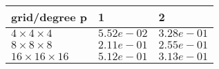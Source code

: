 \begin{tabular}{lll}
\hline
 grid/degree p            & 1          & 2          \\
\hline
 $4 \times 4 \times 4$    & $5.52e-02$ & $3.28e-01$ \\
 $8 \times 8 \times 8$    & $2.11e-01$ & $2.55e-01$ \\
 $16 \times 16 \times 16$ & $5.12e-01$ & $3.13e-01$ \\
\hline
\end{tabular}